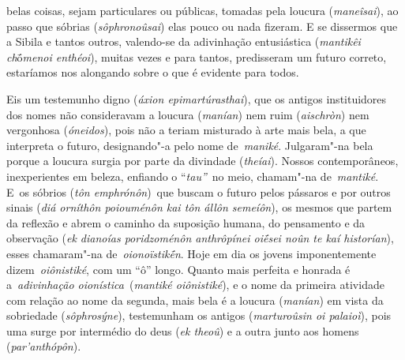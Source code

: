 belas coisas, sejam particulares ou públicas, tomadas pela loucura
(\emph{maneîsai}), \bekker{[244b]} ao passo que sóbrias (\emph{sôphronoûsai})
elas pouco ou nada fizeram.
E se dissermos que a Sibila e tantos outros, valendo-se da adivinhação
entusiástica (\emph{mantikêi ch}ṓ\emph{menoi enthéoi}), muitas vezes e
para tantos, predisseram um futuro correto, estaríamos nos alongando
sobre o que é evidente para todos.

Eis um testemunho digno (\emph{áxion epimartúrasthai}), que os antigos
instituidores dos nomes não consideravam a loucura (\emph{manían}) nem
ruim (\emph{aischròn}) nem vergonhosa (\emph{óneidos}), pois não a
teriam misturado à arte mais bela, a que interpreta o futuro, \bekker{[244c]}
designando"-a pelo nome de~\emph{maniké}. Julgaram"-na bela porque a
loucura surgia por parte da divindade (\emph{theíai}). Nossos
contemporâneos, inexperientes em beleza, enfiando o ``\emph{tau''}~no
meio, chamam"-na de~\emph{mantiké}. E~os sóbrios (\emph{tôn
emphrónôn})~que buscam o futuro pelos pássaros e por outros sinais
(\emph{diá orníthôn poiouménôn kai tôn állôn semeíôn}), os mesmos que
partem da reflexão e abrem o caminho da suposição humana, do pensamento
e da observação (\emph{ek dianoías poridzoménôn anthrôpínei oiḗsei noûn
te kaí historían}), esses chamaram"-na de~\emph{oionoïstikḗn}. Hoje em
dia os jovens imponentemente dizem~\emph{oiônistiké}, com um ``ô''
longo. \bekker{[244d]} Quanto mais perfeita e honrada é a~\emph{adivinhação
oionística~}(\emph{mantiké oiônistiké}), e o nome da primeira atividade
com relação ao nome da segunda, mais bela é a loucura (\emph{manían}) em
vista da sobriedade (\emph{sôphrosýne}), testemunham os antigos
(\emph{marturoûsin oi palaioì}), pois uma surge por intermédio do deus
(\emph{ek theoû}) e a outra junto aos homens (\emph{par'anthópôn}).

